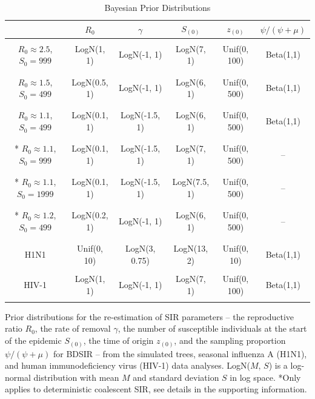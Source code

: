\documentclass[12pt,titlepage]{article}
\newcommand{\BDSIR}{BDSIR}
\begin{document}
\begin{table}[!ht]
\begin{center}
\caption{
\large{Bayesian Prior Distributions}}
\label{table:priors}
\begin{tabular}{|c|c|c|c|c|c|}
\hline
& $R_0$ & $\gamma$ & $S_{(0)}$ & $z_{(0)}$ & $\psi/(\psi+\mu)$ \\
  \hline
   & & & & & \\
${R_0}\approx2.5$, ${S_0}=999$ & LogN(1, 1) & LogN(-1, 1) & LogN(7, 1) & Unif(0, 100) & Beta(1,1) \\
   & & & & & \\
   \hline
   & & & & & \\
${R_0}\approx1.5$, ${S_0}=499$ & LogN(0.5, 1) & LogN(-1, 1) & LogN(6, 1) & Unif(0, 500) & Beta(1,1) \\
   & & & & & \\
   \hline
   & & & & & \\
${R_0}\approx1.1$, ${S_0}=499$ & LogN(0.1, 1) & LogN(-1.5, 1) & LogN(6, 1) & Unif(0, 500) & Beta(1,1) \\
   & & & & & \\
   \hline
   & & & & & \\
* ${R_0}\approx1.1$, ${S_0}=999$ & LogN(0.1, 1) & LogN(-1.5, 1) & LogN(7, 1) & Unif(0, 500) & -- \\
   & & & & & \\
   \hline
   & & & & & \\
* ${R_0}\approx1.1$, ${S_0}=1999$ & LogN(0.1, 1) & LogN(-1.5, 1) & LogN(7.5, 1) & Unif(0, 500) & -- \\
   & & & & & \\
   \hline
   & & & & & \\
* ${R_0}\approx1.2$, ${S_0}=499$ & LogN(0.2, 1) & LogN(-1, 1) & LogN(6, 1) & Unif(0, 500) & -- \\
   & & & & & \\
   \hline
   & & & & & \\
H1N1 & Unif(0, 10) & LogN(3, 0.75) & LogN(13, 2) & Unif(0, 10) & Beta(1,1) \\
   & & & & & \\
HIV-1 & LogN(1, 1) & LogN(-1, 1) & LogN(7, 1) & Unif(0, 100) & Beta(1,1) \\
   & & & & & \\
   \hline
\end{tabular}
\end{center}
{Prior distributions for the re-estimation of SIR parameters -- the reproductive ratio 
$R_0$, the rate of removal $\gamma$, the number of susceptible individuals at the start of 
the epidemic $S_{(0)}$, the time of origin $z_{(0)}$, and the sampling proportion $\psi/(\psi+\mu)$ for \BDSIR{} -- from the simulated trees, seasonal influenza A (H1N1), and human immunodeficiency virus (HIV-1) data analyses. 
LogN($M$, $S$) is a log-normal distribution with mean $M$ and 
standard deviation $S$ in log space.  *Only applies to deterministic coalescent SIR, see details in the supporting information.}
\end{table}
%
\end{document}
